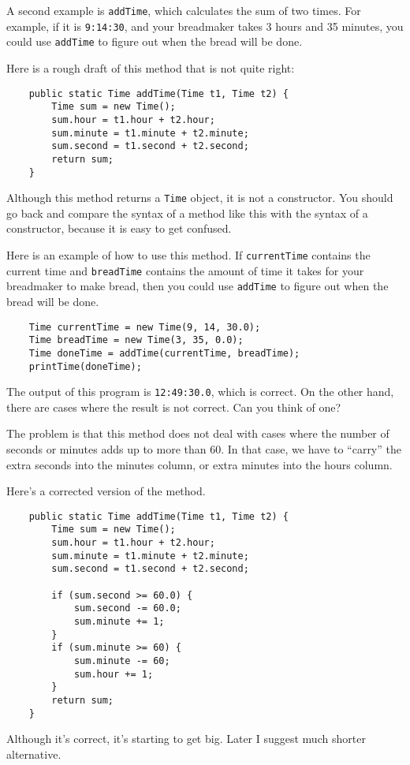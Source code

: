 \documentclass[12pt]{book}
\theoremstyle{definition}
\begin{document}
A second example is {\tt addTime}, which calculates the sum of two
times.  For example, if it is {\tt 9:14:30}, and your breadmaker takes
3 hours and 35 minutes, you could use {\tt addTime} to figure out when
the bread will be done.

Here is a rough draft of this method that is not quite right:

\begin{lstlisting}
    public static Time addTime(Time t1, Time t2) {
        Time sum = new Time();
        sum.hour = t1.hour + t2.hour;
        sum.minute = t1.minute + t2.minute;
        sum.second = t1.second + t2.second;
        return sum;
    }
\end{lstlisting}
%
Although this method returns a {\tt Time} object, it is not
a constructor.  You should go back and compare the syntax of
a method like this with the syntax of a constructor, because
it is easy to get confused.

Here is an example of how to use this method.  If {\tt currentTime}
contains the current time and {\tt breadTime} contains the amount
of time it takes for your breadmaker to make bread, then you
could use {\tt addTime} to figure out when the bread will be
done.

\begin{lstlisting}
    Time currentTime = new Time(9, 14, 30.0);
    Time breadTime = new Time(3, 35, 0.0);
    Time doneTime = addTime(currentTime, breadTime);
    printTime(doneTime);
\end{lstlisting}
%
The output of this program is {\tt 12:49:30.0}, which is
correct.  On the other hand, there are cases where the result
is not correct.  Can you think of one?

The problem is that this method does not deal with cases
where the number of seconds or minutes adds up to more than
60.  In that case, we have to ``carry'' the extra seconds
into the minutes column, or extra minutes into the hours
column.

Here's a corrected version of the method.

\begin{lstlisting}
    public static Time addTime(Time t1, Time t2) {
        Time sum = new Time();
        sum.hour = t1.hour + t2.hour;
        sum.minute = t1.minute + t2.minute;
        sum.second = t1.second + t2.second;

        if (sum.second >= 60.0) {
            sum.second -= 60.0;
            sum.minute += 1;
        }
        if (sum.minute >= 60) {
            sum.minute -= 60;
            sum.hour += 1;
        }
        return sum;
    }
\end{lstlisting}
%
Although it's correct, it's starting to get big.  Later
I suggest much shorter alternative.
\end{document}

